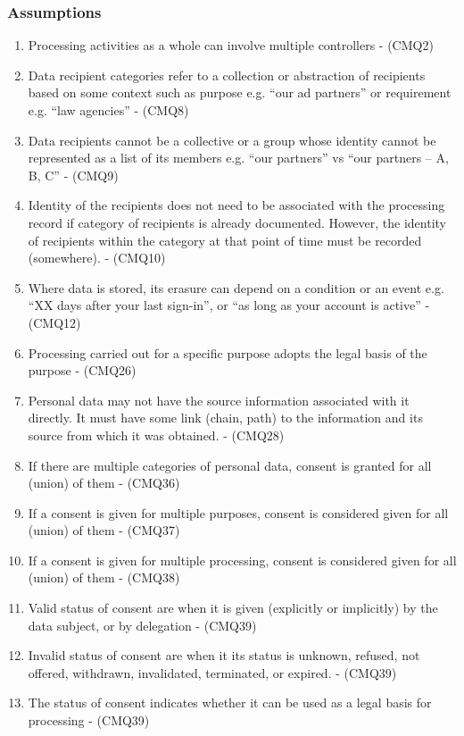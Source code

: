 \subsubsection{Assumptions}
\begin{enumerate}[label={\textit{A.\theenumi}}]
    \item Processing activities as a whole can involve multiple controllers - (CMQ2)
    \item Data recipient categories refer to a collection or abstraction of recipients based on some context such as purpose e.g. “our ad partners” or requirement e.g. “law agencies” - (CMQ8)
    \item Data recipients cannot be a collective or a group whose identity cannot be represented as a list of its members e.g. “our partners” vs “our partners – A, B, C” - (CMQ9)
    \item Identity of the recipients does not need to be associated with the processing record if category of recipients is already documented. However, the identity of recipients within the category at that point of time must be recorded (somewhere). - (CMQ10)
    \item Where data is stored, its erasure can depend on a condition or an event e.g. “XX days after your last sign-in”, or “as long as your account is active” - (CMQ12)
    \item Processing carried out for a specific purpose adopts the legal basis of the purpose - (CMQ26)
    \item Personal data may not have the source information associated with it directly. It must have some link (chain, path) to the information and its source from which it was obtained. - (CMQ28)
    \item If there are multiple categories of personal data, consent is granted for all (union) of them - (CMQ36)
    \item If a consent is given for multiple purposes, consent is considered given for all (union) of them - (CMQ37)
    \item If a consent is given for multiple processing, consent is considered given for all (union) of them - (CMQ38)
    \item Valid status of consent are when it is given (explicitly or implicitly) by the data subject, or by delegation - (CMQ39)
    \item Invalid status of consent are when it its status is unknown, refused, not offered, withdrawn, invalidated, terminated, or expired. - (CMQ39)
    \item The status of consent indicates whether it can be used as a legal basis for processing - (CMQ39)

\end{enumerate}
